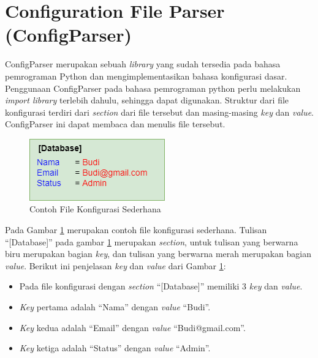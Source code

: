 \section{Configuration File Parser (ConfigParser)}
\label{sec:config}
ConfigParser merupakan sebuah \textit{library} yang sudah tersedia pada bahasa pemrograman Python dan mengimplementasikan bahasa konfigurasi dasar\cite{parser}. Penggunaan ConfigParser pada bahasa pemrograman python perlu melakukan \textit{import library} terlebih dahulu, sehingga dapat digunakan. Struktur dari file konfigurasi terdiri dari \textit{section} dari file tersebut dan masing-masing \textit{key} dan \textit{value}. ConfigParser ini dapat membaca dan menulis file tersebut. 
\begin{figure}[H]
	\centering
	\includegraphics[scale=0.7]{Gambar/config.png}
	\caption{Contoh File Konfigurasi Sederhana} 
	\label{fig:config}
\end{figure}
Pada Gambar \ref{fig:config} merupakan contoh file konfigurasi sederhana. Tulisan ``[Database]'' pada gambar \ref{fig:config} merupakan \textit{section}, untuk tulisan yang berwarna biru merupakan bagian \textit{key}, dan tulisan yang berwarna merah merupakan bagian \textit{value}. Berikut ini penjelasan \textit{key} dan \textit{value} dari Gambar \ref{fig:config}:
\begin{itemize}
	\item Pada file konfigurasi dengan \textit{section} ``[Database]'' memiliki 3 \textit{key} dan \textit{value}.
	\item \textit{Key} pertama adalah ``Nama'' dengan \textit{value} ``Budi''.
	\item \textit{Key} kedua adalah ``Email'' dengan \textit{value} ``Budi@gmail.com''.
	\item \textit{Key} ketiga adalah ``Status'' dengan \textit{value} ``Admin''.
\end{itemize}
